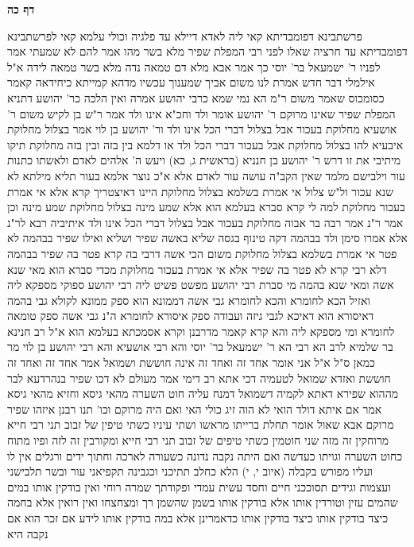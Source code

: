 \documentclass[12pt, openany]{book}
\newcommand{\sethebfont}{
\fontsize{10.5pt}{21.0pt} \selectfont
}
\newcommand{\twocol}[1]{
	{\sethebfont \begin{multicols}{2}
			#1
	\end{multicols}}	
}
\newcommand{\sectname}{}
\newcommand{\newsection}[1]{
	\addcontentsline{toc}{section}{#1}
	\renewcommand{\sectname}{#1}	
	\vspace{-\baselineskip}
	\begin{center}
		\textbf{%
\fontsize{16pt}{16pt}\selectfont
			#1}
	\end{center}
	\vspace{-\baselineskip}
	\nopagebreak
}
\begin{document}
\newsection{דף כה}
\twocol{פרשתבינא דפומבדיתא קאי ליה לאדא דיילא עד פלגיה וכולי עלמא קאי לפרשתבינא דפומבדיתא עד חרציה
שאלו לפני רבי  המפלת שפיר מלא בשר מהו  אמר להם  לא שמעתי 
אמר לפניו ר' ישמעאל בר' יוסי כך אמר אבא  מלא דם טמאה נדה מלא בשר טמאה לידה 
א"ל  אילמלי דבר חדש אמרת לנו משום אביך שמענוך עכשיו
מדהא קמייתא כיחידאה קאמר כסומכוס שאמר משום ר"מ הא נמי שמא כרבי יהושע אמרה ואין הלכה כר' יהושע 
דתניא המפלת שפיר שאינו מרוקם ר' יהושע אומר  ולד וחכ"א  אינו ולד 
אמר ר"ש בן לקיש משום ר' אושעיא  מחלוקת בעכור אבל בצלול דברי הכל אינו ולד  ור' יהושע בן לוי אמר  בצלול מחלוקת 
איבעיא להו  בצלול מחלוקת אבל בעכור דברי הכל ולד או דלמא בין בזה ובין בזה מחלוקת  תיקו 
מיתיבי את זו דרש ר' יהושע בן חנניא  (בראשית ג, כא) ויעש ה' אלהים לאדם ולאשתו כתנות עור וילבישם מלמד שאין הקב"ה עושה עור לאדם אלא א"כ נוצר 
אלמא  בעור תליא מילתא לא שנא עכור ול"ש צלול 
אי אמרת בשלמא בצלול מחלוקת היינו דאיצטריך קרא אלא אי אמרת בעכור מחלוקת למה לי קרא  סברא בעלמא הוא  אלא שמע מינה  בצלול מחלוקת שמע מינה 
וכן אמר ר"נ אמר רבה בר אבוה  מחלוקת בעכור אבל בצלול דברי הכל אינו ולד 
איתיביה רבא לר"נ  אלא אמרו סימן ולד בבהמה דקה טינוף בגסה שליא  באשה שפיר ושליא
ואילו שפיר בבהמה לא פטר  אי אמרת בשלמא בצלול מחלוקת משום הכי 
אשה דרבי בה קרא פטר בה שפיר בבהמה דלא רבי קרא לא פטר בה שפיר 
אלא אי אמרת בעכור מחלוקת מכדי סברא הוא מאי שנא אשה ומאי שנא בהמה 
מי סברת רבי יהושע מפשט פשיט ליה  רבי יהושע ספוקי מספקא ליה ואזיל הכא לחומרא והכא לחומרא 
גבי אשה דממונא הוא ספק ממונא לקולא 
גבי בהמה דאיסורא הוא דאיכא לגבי גיזה ועבודה ספק איסורא לחומרא  ה"נ גבי אשה ספק טומאה לחומרא 
ומי מספקא ליה  והא קרא קאמר  מדרבנן וקרא אסמכתא בעלמא הוא 
א"ל רב חנינא בר שלמיא לרב  הא רבי הא ר' ישמעאל בר' יוסי והא רבי אושעיא והא רבי יהושע בן לוי מר כמאן ס"ל 
א"ל  אני אומר אחד זה ואחד זה אינה חוששת 
ושמואל אמר  אחד זה ואחד זה חוששת  ואזדא שמואל לטעמיה דכי אתא רב דימי אמר  מעולם לא דכו שפיר בנהרדעא לבר מההוא שפירא דאתא לקמיה דשמואל דמנח עליה חוט השערה מהאי גיסא וחזיא מהאי גיסא אמר  אם איתא דולד הואי לא הוה זיג כולי האי
ואם היה מרוקם וכו' תנו רבנן  איזהו שפיר מרוקם  אבא שאול אומר  תחלת ברייתו מראשו ושתי עיניו כשתי טיפין של זבוב  תני רבי חייא  מרוחקין זה מזה  שני חוטמין כשתי טיפים של זבוב 
תני רבי חייא  ומקורבין זה לזה  ופיו מתוח כחוט השערה וגויתו כעדשה ואם היתה נקבה נדונה כשעורה לארכה 
וחתוך ידים ורגלים אין לו ועליו מפורש בקבלה (איוב י, י) הלא כחלב תתיכני וכגבינה תקפיאני  עור ובשר תלבישני ועצמות וגידים תסוככני  חיים וחסד עשית עמדי ופקודתך שמרה רוחי 
ואין בודקין אותו במים שהמים עזין
וטורדין אותו אלא בודקין אותו בשמן שהשמן רך ומצחצחו  ואין רואין אלא בחמה 
כיצד בודקין אותו  כיצד בודקין אותו  כדאמרינן  אלא במה בודקין אותו לידע אם זכר הוא אם נקבה היא 
}
\end{document}
